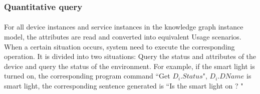 

\subsubsection{Quantitative query}
\paragraph{}
For all device instances and service instances in the knowledge graph instance model, the attributes are read and converted into equivalent Usage scenarios. When a certain situation occurs, system need to execute the corresponding operation. It is divided into two situations: Query the status and attributes of the device and query the status of the environment. For example, if the smart light is turned on, the corresponding program command ``Get $D_{i}.Status$", $D_{i}.DName$  is smart light, the corresponding sentence generated is ``Is the smart light on ? "


